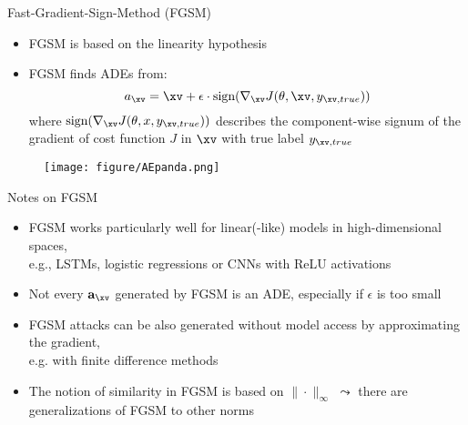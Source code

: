 \documentclass[11pt,compress,t,notes=noshow, aspectratio=169, xcolor=table]{beamer}
\begin{document}
\begin{vbframe}{Fast-Gradient-Sign-Method (FGSM)
}
\begin{itemize}
    \item FGSM is based on the linearity hypothesis
    \item FGSM finds ADEs from:
    \begin{equation*}
        a_{\xv}=\xv+\epsilon\cdot\text{sign}(\nabla_{\xv} J(\theta,\xv,y_{\xv,true}))
    \end{equation*}
    where $\text{sign}(\nabla_{\xv} J(\theta,x,y_{\xv,true}))$ describes the component-wise signum of the gradient of cost function $J$ in $\xv$ with true label $y_{\xv,true}$
\end{itemize}
\begin{figure}[h]
\centering
\texttt{[image: figure/AEpanda.png]}
  \label{fig:mnist}
\end{figure} 

\end{vbframe}

\begin{vbframe}[c]{Notes on FGSM  }
\begin{itemize}
    \item FGSM works particularly well for linear(-like) models in high-dimensional spaces,\\ e.g., LSTMs, logistic regressions or CNNs with ReLU activations
    \item Not every $\mathbf{a}_{\xv}$ generated by FGSM is an ADE, especially if $\epsilon$ is too small
    \item FGSM attacks can be also generated without model access by approximating the gradient,\\ e.g. with finite difference methods
    \item The notion of similarity in FGSM is based on $\|\cdot\|_{\infty}$ $\leadsto$ there are generalizations of FGSM to other norms
\end{itemize}
\end{vbframe}
\end{document}

